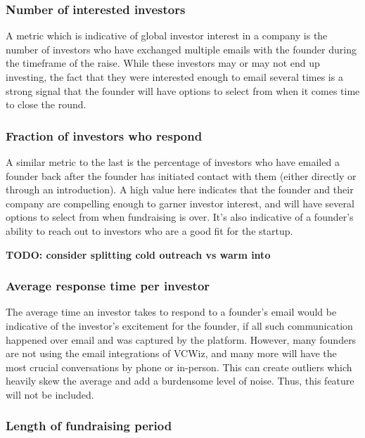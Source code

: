 \subsubsection{Number of interested investors}

A metric which is indicative of global investor interest in a company is the number of investors who have exchanged multiple emails with the founder during the timeframe of the raise. While these investors may or may not end up investing, the fact that they were interested enough to email several times is a strong signal that the founder will have options to select from when it comes time to close the round.

\subsubsection{Fraction of investors who respond}

A similar metric to the last is the percentage of investors who have emailed a founder back after the founder has initiated contact with them (either directly or through an introduction). A high value here indicates that the founder and their company are compelling enough to garner investor interest, and will have several options to select from when fundraising is over. It's also indicative of a founder's ability to reach out to investors who are a good fit for the startup.

\textbf{TODO: consider splitting cold outreach vs warm into}

\subsubsection{Average response time per investor}

The average time an investor takes to respond to a founder's email would be indicative of the investor's excitement for the founder, if all such communication happened over email and was captured by the platform. However, many founders are not using the email integrations of VCWiz, and many more will have the most crucial conversations by phone or in-person. This can create outliers which heavily skew the average and add a burdensome level of noise. Thus, this feature will not be included.

\subsubsection{Length of fundraising period}

